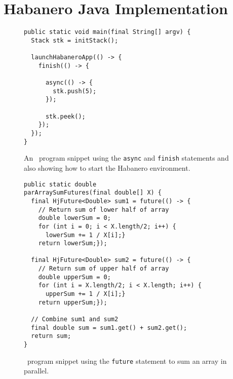 \section{Habanero Java Implementation}

\begin{figure}
  \begin{center}
    \begin{lstlisting}
public static void main(final String[] argv) {
  Stack stk = initStack();
  
  launchHabaneroApp(() -> {
    finish(() -> {

      async(() -> {
        stk.push(5);
      });

      stk.peek();
    });
  });
}
\end{lstlisting}
  \end{center}
  \caption{An \hj\ program snippet using the \texttt{async} and \texttt{finish} statements and also showing how to start the Habanero environment.}
  \label{fig:hj-async-finish}
\end{figure}

\begin{figure}
  \begin{center}
    \begin{lstlisting}
public static double
parArraySumFutures(final double[] X) {
  final HjFuture<Double> sum1 = future(() -> {
    // Return sum of lower half of array
    double lowerSum = 0;
    for (int i = 0; i < X.length/2; i++) {
      lowerSum += 1 / X[i];}
    return lowerSum;});
  
  final HjFuture<Double> sum2 = future(() -> {
    // Return sum of upper half of array
    double upperSum = 0;
    for (int i = X.length/2; i < X.length; i++) {
      upperSum += 1 / X[i];}
	return upperSum;});
		
  // Combine sum1 and sum2
  final double sum = sum1.get() + sum2.get();
  return sum;
}
    \end{lstlisting}

  \end{center}
  \caption{\hj\ program snippet using the \texttt{future} statement to sum an array in parallel.}
  \label{fig:hj-future}
\end{figure}

